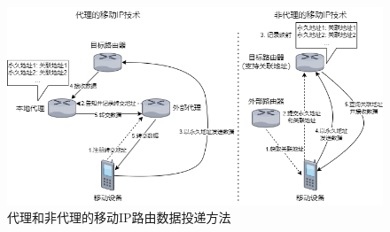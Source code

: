 \documentclass{article}
\begin{document}
\begin{figure}[htbp]
    \centering
    \includegraphics[width=\textwidth]{示意.drawio.png}
    \caption{代理和非代理的移动IP路由数据投递方法}
    \label{fig:ip}
\end{figure}
\end{document}
